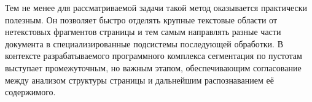 Тем не менее для рассматриваемой задачи такой метод оказывается практически полезным. Он позволяет быстро отделять крупные текстовые области от нетекстовых фрагментов страницы и тем самым направлять разные части документа в специализированные подсистемы последующей обработки. В контексте разрабатываемого программного комплекса сегментация по пустотам выступает промежуточным, но важным этапом, обеспечивающим согласование между анализом структуры страницы и дальнейшим распознаванием её содержимого.